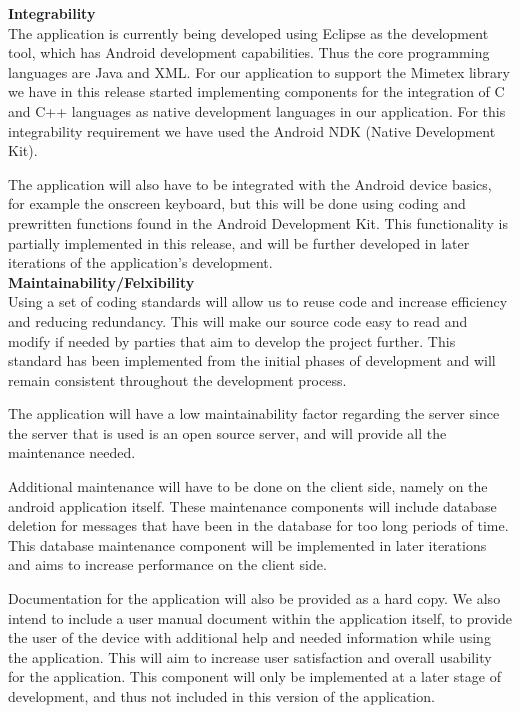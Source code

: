 \documentclass[29pt,a4paper]{moderncv}
\begin{document}
			\noindent\textbf{Integrability}\\
				The application is currently being developed using Eclipse as the development tool, which has Android development capabilities.  Thus the core programming languages are Java and XML.  For our application to support the Mimetex library we have in this release started implementing components for the integration of C and C++ languages as native development languages in our application.  For this integrability requirement we have used the Android NDK (Native Development Kit).
				
				The application will also have to be integrated with the Android device basics, for example the onscreen keyboard, but this will be done using coding and prewritten functions found in the Android Development Kit. This functionality is partially implemented in this release, and will be further developed in later iterations of the application’s development.\\
							
			\noindent\textbf{Maintainability/Felxibility}
				\\Using a set of coding standards will allow us to reuse code and increase efficiency and reducing redundancy. This will make our source code easy to read and modify if needed by parties that aim to develop the project further.  This standard has been implemented from the initial phases of development and will remain consistent throughout the development process.
				
				The application will have a low maintainability factor regarding the server since the server that is used is an open source server, and will provide all the maintenance needed.
				
				Additional maintenance will have to be done on the client side, namely on the android application itself.  These maintenance components will include database deletion for messages that have been in the database for too long periods of time.  This database maintenance component will be implemented in later iterations and aims to increase performance on the client side. 
				
				Documentation for the application will also be provided as a hard copy.  We also intend to include a user manual document within the application itself, to provide the user of the device with additional help and needed information while using the application. This will aim to increase user satisfaction and overall usability for the application.  This component will only be implemented at a later stage of development, and thus not included in this version of the application.
				
\end{document}
